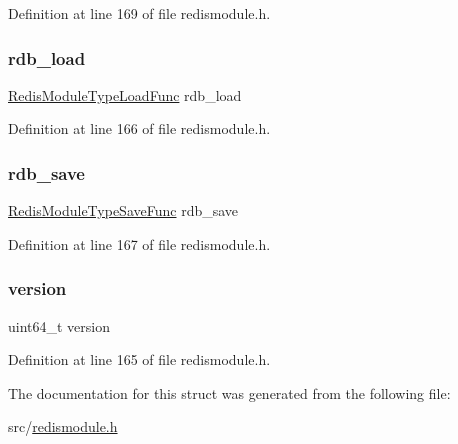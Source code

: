 Definition at line 169 of file redismodule.\+h.

\mbox{\label{struct_redis_module_type_methods_ab845ab6c05b214959d237594f3709d94}} 
\subsubsection{\texorpdfstring{rdb\+\_\+load}{rdb\_load}}
{\footnotesize\ttfamily \hyperlink{redismodule_8h_abc26c0647be3ba4c17bb67cbbf6a0840}{Redis\+Module\+Type\+Load\+Func} rdb\+\_\+load}



Definition at line 166 of file redismodule.\+h.

\mbox{\label{struct_redis_module_type_methods_aeb7e4a91b4aadbcce3cd6437a77cbcf5}} 
\subsubsection{\texorpdfstring{rdb\+\_\+save}{rdb\_save}}
{\footnotesize\ttfamily \hyperlink{redismodule_8h_af69ba4330f4e0f07cf10321c721a32dd}{Redis\+Module\+Type\+Save\+Func} rdb\+\_\+save}



Definition at line 167 of file redismodule.\+h.

\mbox{\label{struct_redis_module_type_methods_aa38fd391d6e9522074df6743fcd3d323}} 
\subsubsection{\texorpdfstring{version}{version}}
{\footnotesize\ttfamily uint64\+\_\+t version}



Definition at line 165 of file redismodule.\+h.



The documentation for this struct was generated from the following file\+:\begin{DoxyCompactItemize}
\item 
src/\hyperlink{redismodule_8h}{redismodule.\+h}\end{DoxyCompactItemize}
